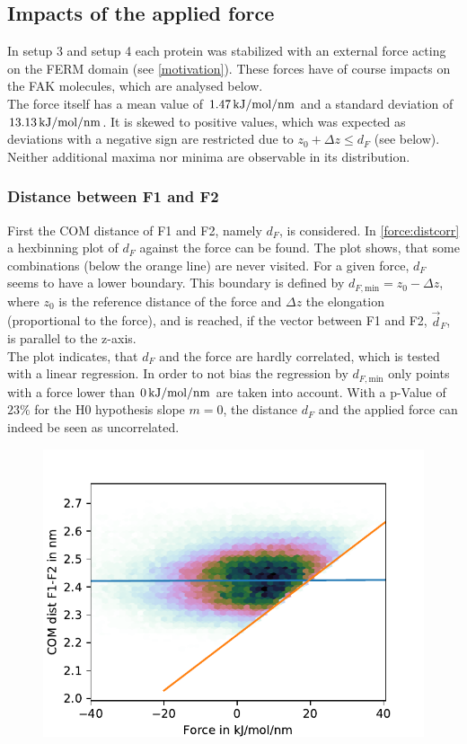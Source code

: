 \subsection{Impacts of the applied force}
In setup 3 and setup 4 each protein was stabilized with an external force acting on the FERM domain (see \autoref{motivation}). These forces have of course impacts on the FAK molecules, which are analysed below.\\
The force itself has a mean value of $1.47\,\si{\kilo\joule/\mole/\nano\metre}$ and a standard deviation of $13.13\,\si{\kilo\joule/\mole/\nano\metre}$. It is skewed to positive values, which was expected as deviations with a negative sign are restricted due to $z_0 + \Delta z \le d_F$ (see below). Neither additional maxima nor minima are observable in its distribution.
\subsubsection{Distance between F1 and F2}
First the COM distance of F1 and F2, namely $d_F$, is considered. In \autoref{force:distcorr} a hexbinning plot of $d_F$ against the force can be found. The plot shows, that some combinations (below the orange line) are never visited. For a given force, $d_F$ seems to have a lower boundary. This boundary is defined by $d_{F, \text{min}} = z_0 - \Delta z$, where $z_0$ is the reference distance of the force and $\Delta z$ the elongation (proportional to the force), and is reached, if the vector between F1 and F2, $\vec{d}_F$, is parallel to the z-axis.\\
The plot indicates, that $d_F$ and the force are hardly correlated, which is tested with a linear regression. In order to not bias the regression by $d_{F, \text{min}}$ only points with a force lower than $0\,\si{\kilo\joule/\mole/\nano\metre}$ are taken into account. With a p-Value of $23\%$ for the H0 hypothesis slope $m = 0$, the distance $d_F$ and the applied force can indeed be seen as uncorrelated.
%
%
%
\begin{figure}
	\centering
	\includegraphics[width=.5\textwidth]{figures/results/force_forcef1f2}
	\label{force:distcorr}
\end{figure}
